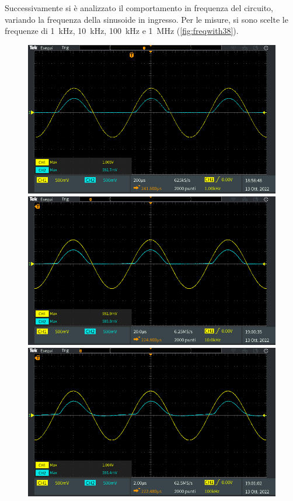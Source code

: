 \newpage
\noindent
Successivamente si è analizzato il comportamento in frequenza del circuito, variando la frequenza della sinusoide in ingresso. Per le misure, si sono scelte le frequenze di \SI{1}{\kilo\hertz}, \SI{10}{\kilo\hertz}, \SI{100}{\kilo\hertz} e \SI{1}{\mega\hertz} (\Fig\ref{fig:freqwith38}).
\begin{figure}[b]
	\centering
	\begin{minipage}{.496\textwidth}
		\includegraphics[width=\linewidth]{./ImageFiles/Laboratorio 2/TEK00011.PNG}
	\end{minipage}
	\begin{minipage}{.496\textwidth}
		\includegraphics[width=\linewidth]{./ImageFiles/Laboratorio 2/TEK00012.PNG}
	\end{minipage}
	\begin{minipage}{.496\textwidth}
		\includegraphics[width=\linewidth]{./ImageFiles/Laboratorio 2/TEK00013.PNG}

\end{minipage}
\end{figure}
